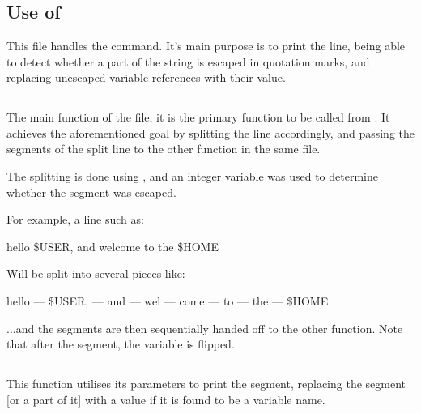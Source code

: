 \documentclass[12pt, a4paper]{report}
\begin{document}
        \section{}
            \subsection{Use of }
                This file handles the  command. It's main purpose
                is to print the line, being able to detect whether a part of
                the string is escaped in quotation marks, and replacing 
                unescaped variable references with their value.

            \subsection{}
                The main function of the file, it is the primary function to
                be called from . It achieves the aforementioned
                goal by splitting the line accordingly, and passing the 
                segments of the split line to the other function in the same file.

                The splitting is done using , and an integer variable
                 was used to determine whether the segment was escaped.

                For example, a line such as:

                \begin{center}
                    hello \$USER, and wel\quot come to the \$HOME\quot
                \end{center}
                
                Will be split into several pieces like:

                \begin{center}
                    hello --- \$USER, --- and --- wel --- come --- to --- the --- \$HOME
                \end{center}

                ...and the segments are then sequentially handed off to the other function.
                Note that after the  segment, the  variable is flipped.

                \clearpage
            
            \subsection{}
                This function utilises its parameters to print the segment,
                replacing the segment [or a part of it] with a value if it
                is found to be a variable name.
\end{document}
